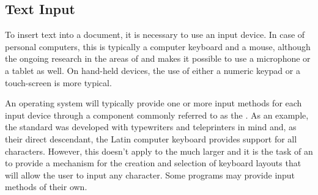 \documentclass{book}
\begin{document}



\subsection{Text Input}
To insert text into a document, it is necessary to use an input device. In case
of personal computers, this is typically a computer keyboard and a mouse,
although the ongoing research in the areas of  and 
makes it possible to use a microphone or a tablet as well. On hand-held devices,
the use of either a numeric keypad or a touch-screen is more typical.

An operating system will typically provide one or more input methods for each
input device through a component commonly referred to as the . As
an example, the  standard was developed with typewriters and
teleprinters in mind and, as their direct descendant, the Latin computer
keyboard provides support for all  characters. However, this
doesn't apply to the much larger  and it is the task of an
 to provide a mechanism for the creation and selection of keyboard
layouts that will allow the user to input any  character. Some
programs may provide input methods of their own.

\end{document}
